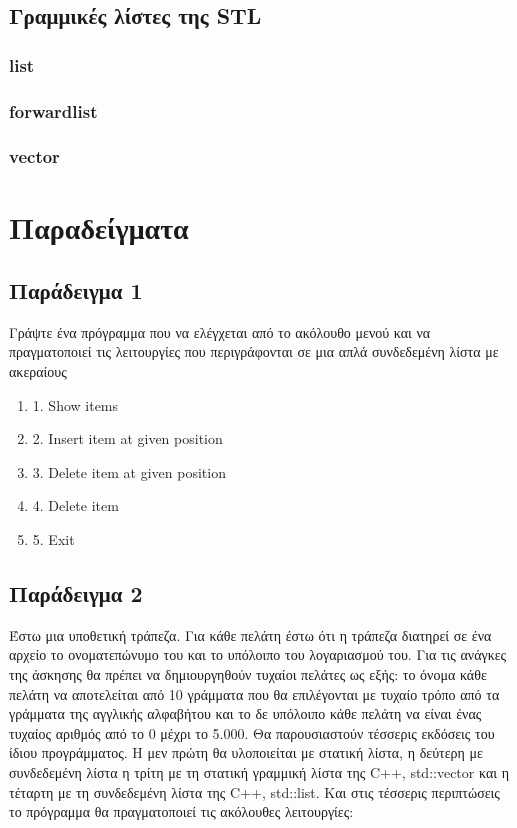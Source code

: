 



\subsection{Γραμμικές λίστες της STL}
\subsubsection{list}
\subsubsection{forwardlist}
\subsubsection{vector}


\section{Παραδείγματα}
\subsection{Παράδειγμα 1}
Γράψτε ένα πρόγραμμα που να ελέγχεται από το ακόλουθο μενού και να πραγματοποιεί τις λειτουργίες που περιγράφονται σε μια απλά συνδεδεμένη λίστα με ακεραίους
\begin{enumerate}
\item 1. Show items
\item 2. Insert item at given position 
\item 3. Delete item at given position
\item 4. Delete item
\item 5. Exit
\end{enumerate}

\subsection{Παράδειγμα 2}
Έστω μια υποθετική τράπεζα. Για κάθε πελάτη έστω ότι η τράπεζα διατηρεί σε ένα αρχείο το ονοματεπώνυμο του και το υπόλοιπο του λογαριασμού του. Για τις ανάγκες της άσκησης θα πρέπει να δημιουργηθούν τυχαίοι πελάτες ως εξής: το όνομα κάθε πελάτη να αποτελείται από 10 γράμματα που θα επιλέγονται με τυχαίο τρόπο από τα γράμματα της αγγλικής αλφαβήτου και το δε υπόλοιπο κάθε πελάτη να είναι ένας τυχαίος αριθμός από το 0 μέχρι το 5.000. 
Θα παρουσιαστούν τέσσερις εκδόσεις του ίδιου προγράμματος. Η μεν πρώτη θα υλοποιείται με στατική λίστα,  η δεύτερη με συνδεδεμένη λίστα η τρίτη με τη στατική γραμμική λίστα της C++, std::vector και η τέταρτη με τη συνδεδεμένη λίστα της C++, std::list. Και στις τέσσερις περιπτώσεις το πρόγραμμα θα πραγματοποιεί τις ακόλουθες λειτουργίες:

